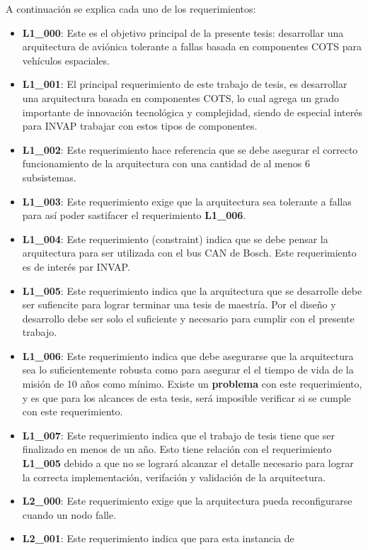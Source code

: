 A continuación se explica cada uno de los requerimientos:
\begin{itemize}
\item\textbf{L1\_000}: Este es el objetivo principal de la presente tesis:
  desarrollar una arquitectura de aviónica tolerante a fallas basada en
  componentes COTS para vehículos espaciales.
\item\textbf{L1\_001}: El principal requerimiento de este trabajo de tesis,
  es desarrollar una arquitectura basada en componentes COTS, lo cual agrega un
  grado importante de innovación tecnológica y complejidad, siendo de especial
  interés para INVAP trabajar con estos tipos de componentes.
\item\textbf{L1\_002}: Este requerimiento hace referencia que se debe asegurar
  el correcto funcionamiento de la arquitectura con una cantidad de al menos
  6 subsistemas.
\item\textbf{L1\_003}: Este requerimiento exige que la arquitectura sea
  tolerante a fallas para así poder sastifacer el requerimiento \textbf{L1\_006}.
\item\textbf{L1\_004}: Este requerimiento (constraint) indica que se debe pensar
  la arquitectura para ser utilizada con el bus CAN de Bosch. Este requerimiento
  es de interés par INVAP.
\item\textbf{L1\_005}: Este requerimiento indica que la arquitectura que se
  desarrolle debe ser sufiencite para lograr terminar una tesis de maestría. Por
  el diseño y desarrollo debe ser solo el suficiente y necesario para cumplir
  con el presente trabajo.
\item\textbf{L1\_006}: Este requerimiento indica que debe asegurarse que la
  arquitectura sea lo suficientemente robusta como para asegurar el el tiempo de
  vida de la misión de 10 años como mínimo. Existe un \textbf{problema} con este
  requerimiento, y es que para los alcances de esta tesis, será imposible
  verificar si se cumple con este requerimiento.
\item\textbf{L1\_007}: Este requerimiento indica que el trabajo de tesis tiene
  que ser finalizado en menos de un año. Esto tiene relación con el
  requerimiento \textbf{L1\_005} debido a que no se logrará alcanzar el detalle
  necesario para lograr la correcta implementación, verifación y validación de
  la arquitectura.
\item\textbf{L2\_000}: Este requerimiento exige que la arquitectura pueda
  reconfigurarse cuando un nodo falle.
\item\textbf{L2\_001}: Este requerimiento indica que para esta instancia de

\end{itemize}
